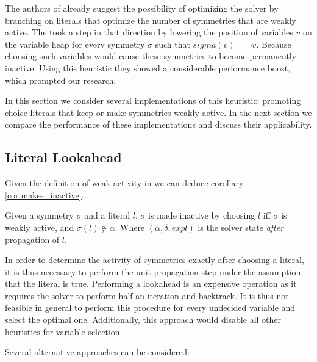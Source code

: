 
The authors of \cite{katebi2010symmetry} already suggest the possibility of optimizing the solver by
branching on literals that optimize the number of symmetries that are weakly active.
The took a step in that direction by lowering the position of variables $v$ on the variable heap for
every symmetry $\sigma$ such that $sigma(v) = \neg v$.
Because choosing such variables would cause these symmetries to become permanently inactive.
Using this heuristic they showed a considerable performance boost, which prompted our research.

In this section we consider several implementations of this heuristic: promoting choice literals
that keep or make symmetries weakly active.
In the next section we compare the performance of these implementations and discuss their
applicability.

\subsection{Literal Lookahead}
	Given the definition of weak activity in  we can deduce corollary
	\ref{cor:makes_inactive}. \\

	\begin{corollary}
		\label{cor:makes_inactive}
		Given a symmetry $\sigma$ and a literal $l$, $\sigma$ is made inactive by choosing $l$ iff
		$\sigma$ is weakly active, and $\sigma(l) \notin \alpha$. Where
		$(\alpha,\delta,\textit{expl})$ is the solver state \emph{after} propagation of $l$.
	\end{corollary}

	In order to determine the activity of symmetries exactly after choosing a literal, it is thus
	necessary to perform the unit propagation step under the assumption that the literal is true.
	Performing a lookahead is an expensive operation as it requires the solver to perform half an
	iteration and backtrack.
	It is thus not feasible in general to perform this procedure for every undecided variable and
	select the optimal one.
	Additionally, this approach would disable all other heuristics for variable selection.

	Several alternative approaches can be considered:

